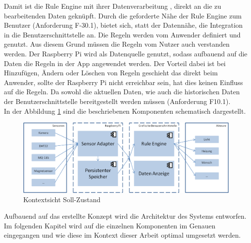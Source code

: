 Damit ist die Rule Engine mit ihrer Datenverarbeitung \cite{Hayes-Roth:1985:RS:4284.4286}, direkt an die zu bearbeitenden Daten geknüpft. Durch die geforderte Nähe der Rule Engine zum Benutzer (Anforderung F-30.1), bietet sich, statt der Datennähe, die Integration in die Benutzerschnittstelle an. Die Regeln werden vom Anwender definiert und genutzt. Aus diesem Grund müssen die Regeln vom Nutzer auch verstanden werden. Der Raspberry Pi wird als Datenquelle genutzt, sodass aufbauend auf die Daten die Regeln in der App angewendet werden. Der Vorteil dabei ist bei Hinzufügen, Ändern oder Löschen von Regeln geschieht das direkt beim Anwender, sollte der Raspberry Pi nicht erreichbar sein, hat dies keinen Einfluss auf die Regeln. Da sowohl die aktuellen Daten, wie auch die historischen Daten der Benutzerschnittstelle bereitgestellt werden müssen (Anforderung F10.1).\\
In der Abbildung \ref{fig:M1} sind die beschriebenen Komponenten schematisch dargestellt.\\
\begin{figure}
  \centering
    \includegraphics[width=1\textwidth]{images/Konzept_allgemein.png}
  \caption{Kontextsicht Soll-Zustand}
  \label{fig:M1}
\end{figure}
Aufbauend auf das erstellte Konzept wird die Architektur des Systems entworfen. Im folgenden Kapitel wird auf die einzelnen Komponenten im Genauen eingegangen und wie diese im Kontext dieser Arbeit optimal umgesetzt werden. 